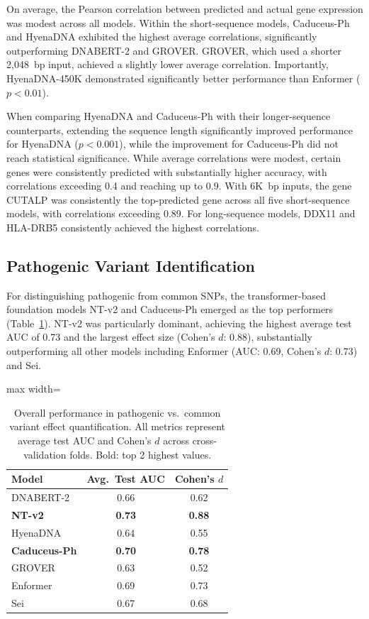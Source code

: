 \documentclass{article}
\begin{document}
On average, the Pearson correlation between predicted and actual gene expression was modest across all models. Within the short-sequence models, Caduceus-Ph and HyenaDNA exhibited the highest average correlations, significantly outperforming DNABERT-2 and GROVER. GROVER, which used a shorter 2,048~bp input, achieved a slightly lower average correlation. Importantly, HyenaDNA-450K demonstrated significantly better performance than Enformer ($p<0.01$).

When comparing HyenaDNA and Caduceus-Ph with their longer-sequence counterparts, extending the sequence length significantly improved performance for HyenaDNA ($p < 0.001$), while the improvement for Caduceus-Ph did not reach statistical significance. While average correlations were modest, certain genes were consistently predicted with substantially higher accuracy, with correlations exceeding 0.4 and reaching up to 0.9. With 6K~bp inputs, the gene CUTALP was consistently the top-predicted gene across all five short-sequence models, with correlations exceeding 0.89. For long-sequence models, DDX11 and HLA-DRB5 consistently achieved the highest correlations.

\subsection{Pathogenic Variant Identification}

For distinguishing pathogenic from common SNPs, the transformer-based foundation models NT-v2 and Caduceus-Ph emerged as the top performers (Table~\ref{tab:pathogenic}). NT-v2 was particularly dominant, achieving the highest average test AUC of 0.73 and the largest effect size (Cohen's $d$: 0.88), substantially outperforming all other models including Enformer (AUC: 0.69, Cohen's $d$: 0.73) and Sei.

\begin{table}[htbp]
\centering
\caption{Overall performance in pathogenic vs.\ common variant effect quantification. All metrics represent average test AUC and Cohen's $d$ across cross-validation folds. Bold: top 2 highest values.}
\label{tab:pathogenic}
\begin{adjustbox}{max width=\textwidth}
\begin{tabular}{lcc}
\toprule
Model & Avg.\ Test AUC & Cohen's $d$ \\
\midrule
DNABERT-2 & 0.66 & 0.62 \\
\textbf{NT-v2} & \textbf{0.73} & \textbf{0.88} \\
HyenaDNA & 0.64 & 0.55 \\
\textbf{Caduceus-Ph} & \textbf{0.70} & \textbf{0.78} \\
GROVER & 0.63 & 0.52 \\
Enformer & 0.69 & 0.73 \\
Sei & 0.67 & 0.68 \\
\bottomrule
\end{tabular}
\end{adjustbox}
\end{table}
\end{document}
